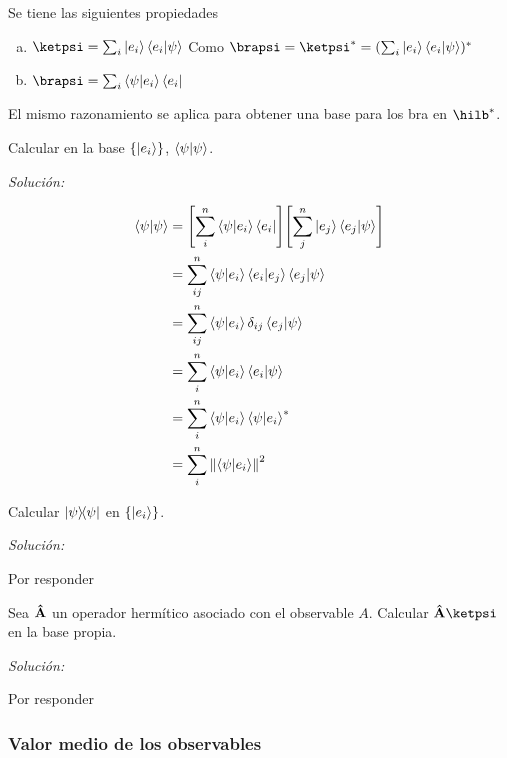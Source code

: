 Se tiene las siguientes propiedades
\begin{enumerate}[a)]
    \item $\ketpsi=\sum_i \ket{e_i}\braket{e_i}{\psi}$
    Como $\brapsi=\ketpsi^*=(\sum_i \ket{e_i}\braket{e_i}{\psi})^*$
    \item $\brapsi=\sum_i \braket{\psi}{e_i}\bra{e_i}$
\end{enumerate}

El mismo razonamiento se aplica para obtener una base para los bra en $\hilb^*$.

\begin{example}
    Calcular en la base $\{\ket{e_i}\}$, $\braket{\psi}$.
    
    \textit{Solución:}
    
    \begin{align*}
        \braket{\psi}&=\qty\Bigg[\sum_i^n\braket{\psi}{e_i}\bra{e_i}]\qty\Bigg[\sum_j^n\ket{e_j}\braket{e_j}{\psi}]\\
        &=\sum_{ij}^n\braket{\psi}{e_i}\bra{e_i}\ket{e_j}\braket{e_j}{\psi}\\
        &=\sum_{ij}^n \braket{\psi}{e_i}\delta_{ij}\braket{e_j}{\psi}\\
        &=\sum_i^n \braket{\psi}{e_i}\braket{e_i}{\psi}\\
        &=\sum_i^n \braket{\psi}{e_i}\braket{\psi}{e_i}^*\\
        &=\sum_i^n \norm{\braket{\psi}{e_i}}^2
    \end{align*}
\end{example}

\begin{example}[Deber]
      Calcular $\op{\psi}$ en $\{\ket{e_i}\}$.
      
    \textit{Solución:}
    
    Por responder
\end{example}

\begin{example}[Deber]
      Sea $\vu{A}$ un operador hermítico asociado con el observable $A$. Calcular $\vu{A}\ketpsi$ en la base propia.
      
    \textit{Solución:}
    
    Por responder
\end{example}

\subsubsection{Valor medio de los observables}

